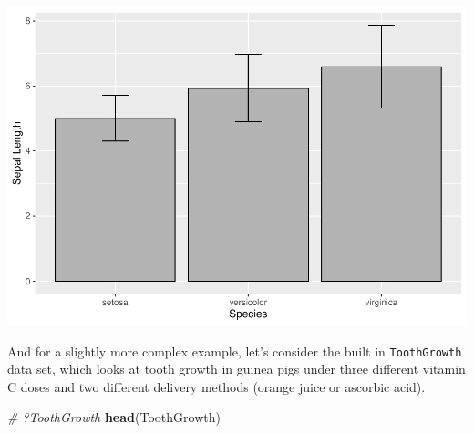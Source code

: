 \documentclass[
]{article}
\newenvironment{Shaded}{\begin{snugshade}}{\end{snugshade}}
\newcommand{\CommentTok}[1]{\textcolor[rgb]{0.56,0.35,0.01}{\textit{#1}}}
\newcommand{\FunctionTok}[1]{\textcolor[rgb]{0.13,0.29,0.53}{\textbf{#1}}}
\newcommand{\NormalTok}[1]{#1}
\begin{document}
\includegraphics{module1_3_files/figure-latex/unnamed-chunk-15-1.pdf}

And for a slightly more complex example, let's consider the built in
\texttt{ToothGrowth} data set, which looks at tooth growth in guinea
pigs under three different vitamin C doses and two different delivery
methods (orange juice or ascorbic acid).

\begin{Shaded}
\begin{Highlighting}[]
\CommentTok{\# ?ToothGrowth}
\FunctionTok{head}\NormalTok{(ToothGrowth)}
\end{Highlighting}
\end{Shaded}
\end{document}

